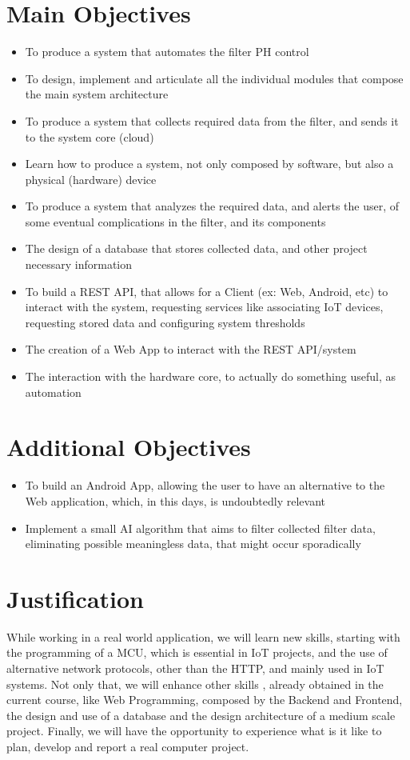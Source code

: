 \documentclass[a4paper,twoside,11pt]{article}
\begin{document}
\section*{Main Objectives}
\begin{itemize}
  \item To produce a system that automates the filter PH control
  \item To design, implement and articulate all the individual modules that compose the main system architecture
  \item To produce a system that collects required data from the filter, and sends it to the system core (cloud)
  \item Learn how to produce a system, not only composed by software, but also a physical (hardware) device
  \item To produce a system that analyzes the required data, and alerts the user, of some eventual complications in the filter, and its components
  \item The design of a database that stores collected data, and other project necessary information
  \item To build a REST API, that allows for a Client (ex: Web, Android, etc) to interact with the system, requesting services like associating IoT devices, requesting stored data and configuring system thresholds
  \item The creation of a Web App to interact with the REST API/system
  \item The interaction with the hardware core, to actually do something useful, as automation
\end{itemize}

\section*{Additional Objectives}
\begin{itemize}
  \item To build an Android App, allowing the user to have an alternative to the Web application, which, in this days, is undoubtedly relevant
  \item Implement a small AI algorithm that aims to filter collected filter data, eliminating possible meaningless data, that might occur sporadically
\end{itemize}

\section*{Justification}
While working in a real world application, we will learn new skills, starting with the programming of a MCU, which is essential in IoT projects, and the use of alternative network protocols, other than the HTTP, and mainly used in IoT systems. Not only that, we will enhance other skills , already obtained in the current course, like Web Programming, composed by the Backend and Frontend, the design and use of a database and the design architecture of a medium scale project. Finally, we will have the opportunity to experience what is it like to plan, develop and report a real computer project.
\end{document}
